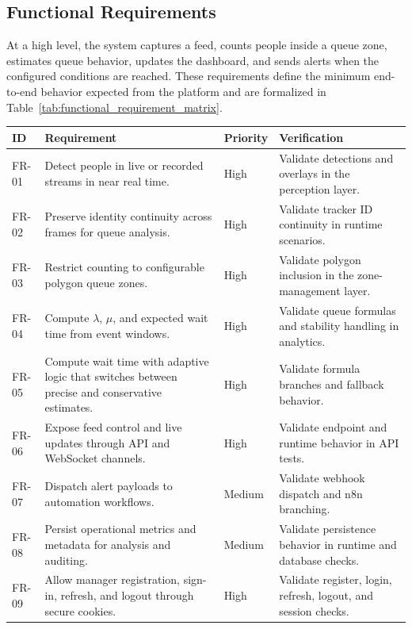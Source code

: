 \subsection{Functional Requirements}
At a high level, the system captures a feed, counts people inside a queue zone, estimates queue behavior, updates the dashboard, and sends alerts when the configured conditions are reached. These requirements define the minimum end-to-end behavior expected from the platform and are formalized in Table~\ref{tab:functional_requirement_matrix}.
\begin{table}[H]
    \centering
    \begingroup\setlength{\tabcolsep}{4pt}\renewcommand{\arraystretch}{0.95}\footnotesize
    \begin{tabularx}{\textwidth}{|l|X|l|X|}
        \hline
        ID & Requirement & Priority & Verification \\ \hline
        FR-01 & Detect people in live or recorded streams in near real time. & High & Validate detections and overlays in the perception layer. \\ \hline
        FR-02 & Preserve identity continuity across frames for queue analysis. & High & Validate tracker ID continuity in runtime scenarios. \\ \hline
        FR-03 & Restrict counting to configurable polygon queue zones. & High & Validate polygon inclusion in the zone-management layer. \\ \hline
        FR-04 & Compute $\lambda$, $\mu$, and expected wait time from event windows. & High & Validate queue formulas and stability handling in analytics. \\ \hline
        FR-05 & Compute wait time with adaptive logic that switches between precise and conservative estimates. & High & Validate formula branches and fallback behavior. \\ \hline
        FR-06 & Expose feed control and live updates through API and WebSocket channels. & High & Validate endpoint and runtime behavior in API tests. \\ \hline
        FR-07 & Dispatch alert payloads to automation workflows. & Medium & Validate webhook dispatch and n8n branching. \\ \hline
        FR-08 & Persist operational metrics and metadata for analysis and auditing. & Medium & Validate persistence behavior in runtime and database checks. \\ \hline
        FR-09 & Allow manager registration, sign-in, refresh, and logout through secure cookies. & High & Validate register, login, refresh, logout, and session checks. \\ \hline

\end{tabularx}
\end{table}
